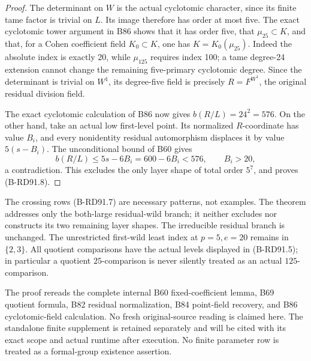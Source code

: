 \begin{proof}
The determinant on \(W\) is the actual cyclotomic character,
since its finite tame factor is trivial on \(L\). Its image
therefore has order at most five. The exact cyclotomic tower
argument in B86 shows that it has order five, that
\(\mu_{25}\subset K\), and that, for a Cohen coefficient field
\(K_0\subset K\), one has \(K=K_0(\mu_{25})\). Indeed the
absolute index is exactly 20, while \(\mu_{125}\) requires
index 100; a tame degree-24 extension cannot change the remaining
five-primary cyclotomic degree. Since the determinant is trivial
on \(W^1\), its degree-five field is precisely
\(R=F^{W^1}\), the original residual division field.

The exact cyclotomic calculation of B86 now gives
\(b(R/L)=24^2=576\). On the other hand, take an actual low
first-level point. Its normalized \(R\)-coordinate has value
\(B_i\), and every nonidentity residual automorphism displaces
it by value \(5(s-B_i)\). The unconditional bound of B60 gives
\[
             b(R/L)\le5s-6B_i=600-6B_i<576,
                        \qquad B_i>20,                \tag{B-RD91.11}
\]
a contradiction. This excludes the only layer shape of total
order \(5^7\), and proves (B-RD91.8).
\end{proof}

\begin{remark}
\label{rem:B-RD91-scope}
The crossing rows (B-RD91.7) are necessary patterns, not examples.
The theorem addresses only the both-large residual-wild branch;
it neither excludes nor constructs its two remaining layer shapes.
The irreducible residual branch is unchanged. The unrestricted
first-wild least index at \(p=5,e=20\) remains in \(\{2,3\}\).
All quotient comparisons have the actual levels displayed in
(B-RD91.5); in particular a quotient \(25\)-comparison is never
silently treated as an actual \(125\)-comparison.

The proof rereads the complete internal B60 fixed-coefficient
lemma, B69 quotient formula, B82 residual normalization, B84
point-field recovery, and B86 cyclotomic-field calculation.
No fresh original-source reading is claimed here. The standalone
finite supplement is retained separately and will be cited with
its exact scope and actual runtime after execution. No finite
parameter row is treated as a formal-group existence assertion.
\end{remark}

